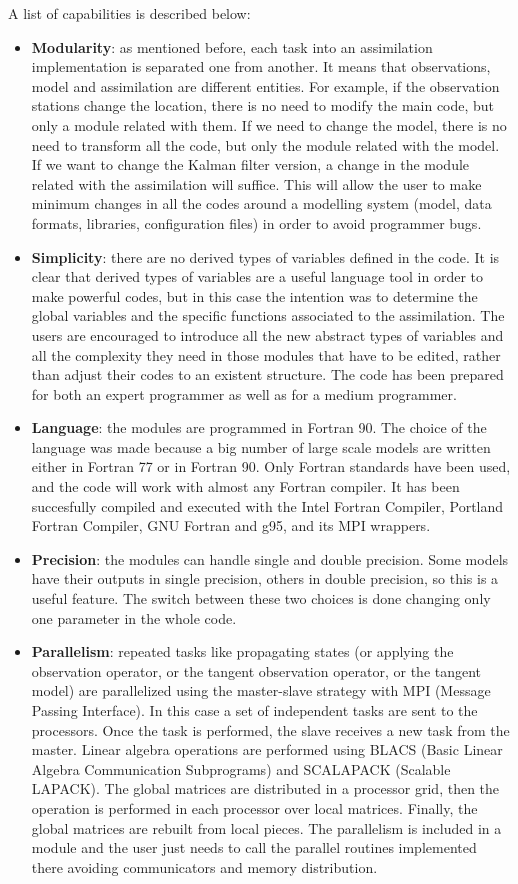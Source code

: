\documentclass[12pt]{article}
\begin{document}
A list of capabilities is described below:
\begin{itemize}
\item {\bf Modularity}: as mentioned before, each task into an assimilation implementation is separated one from another. It means that observations, model and assimilation are different entities. For example, if the observation stations change the location, there is no need to modify the main code, but only a module related with them. If we need to change the model, there is no need to transform all the code, but only the module related with the model. If we want to change the Kalman filter version, a change in the module related with the assimilation will suffice. This will allow the user to make minimum changes in all the codes around a modelling system (model, data formats, libraries, configuration files) in order to avoid programmer bugs. 
\item {\bf Simplicity}: there are no derived types of variables defined in the code. It is clear that derived types of variables are a useful language tool in order to make powerful codes, but in this case the intention was to determine the global variables and the specific functions associated to the assimilation. The users are encouraged to introduce all the new abstract types of variables and all the complexity they need in those modules that have to be edited, rather than adjust their codes to an existent structure. The code has been prepared for both an expert programmer as well as for a medium programmer.
\item {\bf Language}: the modules are programmed in Fortran 90. The choice of the language was made because a big number of large scale models are written either in Fortran 77 or in Fortran 90. Only Fortran standards have been used, and the code will work with almost any Fortran compiler. It has been succesfully compiled and executed with the Intel Fortran Compiler, Portland Fortran Compiler, GNU Fortran and g95, and its MPI wrappers.  
\item {\bf Precision}: the modules can handle single and double precision. Some models have their outputs in single precision, others in double precision, so this is a useful feature. The switch between these two choices is done changing only one parameter in the whole code.
\item {\bf Parallelism}: repeated tasks like propagating states (or applying the observation operator, or the tangent observation operator, or the tangent model) are parallelized using the master-slave strategy with MPI (Message Passing Interface). In this case a set of independent tasks are sent to the processors. Once the task is performed, the slave receives a new task from the master. Linear algebra operations are performed using BLACS (Basic Linear Algebra Communication Subprograms) and SCALAPACK (Scalable LAPACK). The global matrices are distributed in a processor grid, then the operation is performed in each processor over local matrices. Finally, the global matrices are rebuilt from local pieces. The parallelism is included in a module and the user just needs to call the parallel routines implemented there avoiding communicators and memory distribution.
\end{itemize}
\end{document}
